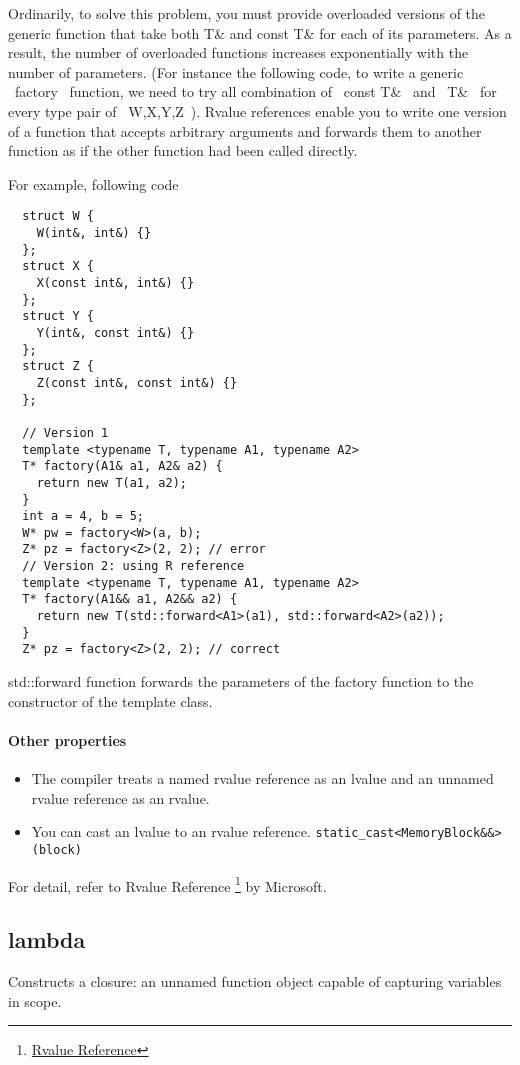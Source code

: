 Ordinarily, to solve this problem, you must provide overloaded
versions of the generic function that take both T\& and const T\& for
each of its parameters.  As a result, the number of overloaded
functions increases exponentially with the number of parameters.  (For
instance the following code, to write a generic ~factory~ function, we
need to try all combination of ~const T\&~ and ~T\&~ for every type pair
of ~W,X,Y,Z~).  Rvalue references enable you to write one version of a
function that accepts arbitrary arguments and forwards them to another
function as if the other function had been called directly.

For example, following code
\begin{lstlisting}
  struct W {
    W(int&, int&) {}
  };
  struct X {
    X(const int&, int&) {}
  };
  struct Y {
    Y(int&, const int&) {}
  };
  struct Z {
    Z(const int&, const int&) {}
  };

  // Version 1
  template <typename T, typename A1, typename A2>
  T* factory(A1& a1, A2& a2) {
    return new T(a1, a2);
  }
  int a = 4, b = 5;
  W* pw = factory<W>(a, b);
  Z* pz = factory<Z>(2, 2); // error
  // Version 2: using R reference
  template <typename T, typename A1, typename A2>
  T* factory(A1&& a1, A2&& a2) {
    return new T(std::forward<A1>(a1), std::forward<A2>(a2));
  }
  Z* pz = factory<Z>(2, 2); // correct
\end{lstlisting}

std::forward function forwards the parameters of the factory function
to the constructor of the template class.

\paragraph{Other properties}
\begin{itemize}
\item The compiler treats a named rvalue reference as an lvalue and an unnamed rvalue reference as an rvalue.
\item You can cast an lvalue to an rvalue reference. \verb$static_cast<MemoryBlock&&>(block)$
\end{itemize}
For detail, refer to Rvalue Reference
\footnote{\href{https://msdn.microsoft.com/en-us/library/dd293668.aspx}{Rvalue
    Reference}} by Microsoft.


\subsection{lambda}
 Constructs a closure: an unnamed function object capable of capturing variables in scope.

